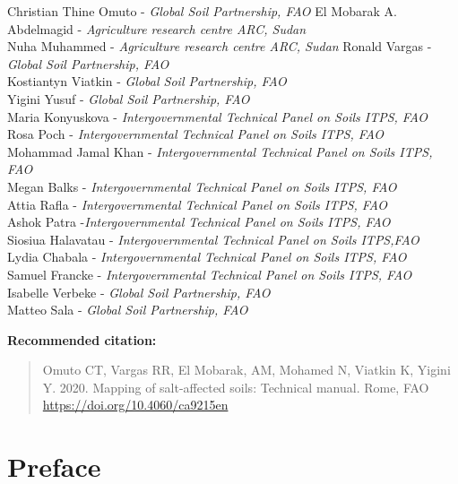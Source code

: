 \documentclass[
  10pt,
  b5paper,
]{book}
\begin{document}
Christian Thine Omuto - \emph{Global Soil Partnership, FAO }
El Mobarak A. Abdelmagid - \emph{Agriculture research centre ARC, Sudan}\\
Nuha Muhammed - \emph{Agriculture research centre ARC, Sudan}
Ronald Vargas - \emph{Global Soil Partnership, FAO }\\
Kostiantyn Viatkin - \emph{Global Soil Partnership, FAO }\\
Yigini Yusuf - \emph{Global Soil Partnership, FAO }\\
Maria Konyuskova - \emph{Intergovernmental Technical Panel on Soils ITPS, FAO}\\
Rosa Poch - \emph{Intergovernmental Technical Panel on Soils ITPS, FAO}\\
Mohammad Jamal Khan - \emph{Intergovernmental Technical Panel on Soils ITPS, FAO}\\
Megan Balks - \emph{Intergovernmental Technical Panel on Soils ITPS, FAO}\\
Attia Rafla - \emph{Intergovernmental Technical Panel on Soils ITPS, FAO}\\
Ashok Patra -\emph{Intergovernmental Technical Panel on Soils ITPS, FAO}\\
Siosiua Halavatau - \emph{Intergovernmental Technical Panel on Soils ITPS,FAO}\\
Lydia Chabala - \emph{Intergovernmental Technical Panel on Soils ITPS, FAO}\\
Samuel Francke - \emph{Intergovernmental Technical Panel on Soils ITPS, FAO}\\
Isabelle Verbeke - \emph{Global Soil Partnership, FAO }\\
Matteo Sala - \emph{Global Soil Partnership, FAO }

\textbf{Recommended citation:}

\begin{quote}
Omuto CT, Vargas RR, El Mobarak, AM, Mohamed N, Viatkin K, Yigini Y. 2020. Mapping of salt-affected soils: Technical manual. Rome, FAO
\url{https://doi.org/10.4060/ca9215en}
\end{quote}

\hypertarget{preface}{%
\chapter*{Preface}\label{preface}}
\end{document}
